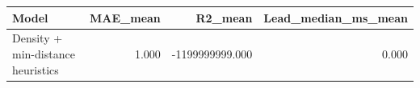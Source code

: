 \begin{tabular}{lrrr}
\toprule
Model & MAE\_mean & R2\_mean & Lead\_median\_ms\_mean \\
\midrule
Density + min-distance heuristics & 1.000 & -1199999999.000 & 0.000 \\
\bottomrule
\end{tabular}